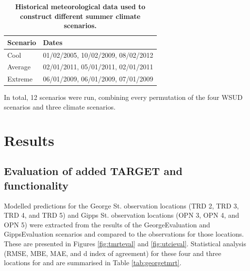 \documentclass[final,3p,times,authoryear]{elsarticle}
\begin{document}
\begin{table}[!htbp]
\caption{\bf Historical meteorological data used to construct different summer climate scenarios.  \label{tab:dates}}     
\begin{tabular}{ l l}
\textbf{Scenario} & \textbf{Dates}\\ \hline
Cool & 01/02/2005, 10/02/2009, 08/02/2012 \\ 
Average & 02/01/2011, 05/01/2011, 02/01/2011 \\ 
Extreme & 06/01/2009, 06/01/2009, 07/01/2009 \\ 
\hline
\end{tabular}
\end{table}

In total, 12 scenarios were run, combining every permutation of the four WSUD scenarios and three climate scenarios.


%

\section{Results}

\subsection{Evaluation of added TARGET  and  functionality}


Modelled predictions for the George St. observation locations (TRD 2, TRD 3, TRD 4, and TRD 5) and Gipps St. observation locations (OPN 3, OPN 4, and OPN 5) were extracted from the results of the GeorgeEvaluation and GippsEvaluation scenarios and compared to the observations for those locations. These are presented in Figures \ref{fig:tmrteval} and \ref{fig:utcieval}. Statistical analysis (RMSE, MBE, MAE, and d index of agreement) for these four and three locations for  and  are summarised in Table \ref{tab:georgetmrt}.
\end{document}
